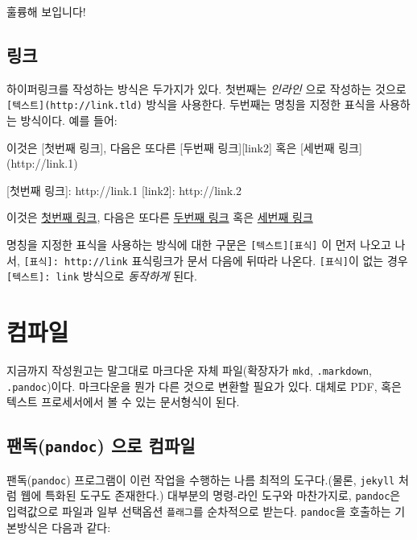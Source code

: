 \documentclass[
  letterpaper,
]{book}
\newenvironment{Shaded}{\begin{snugshade}}{\end{snugshade}}
\newcommand{\AttributeTok}[1]{\textcolor[rgb]{0.40,0.45,0.13}{#1}}
\newcommand{\KeywordTok}[1]{\textcolor[rgb]{0.00,0.23,0.31}{#1}}
\begin{document}
훌륭해 보입니다!

\hypertarget{uxb9c1uxd06c}{%
\subsection{링크}\label{uxb9c1uxd06c}}

하이퍼링크를 작성하는 방식은 두가지가 있다. 첫번째는 \emph{인라인} 으로
작성하는 것으로 \texttt{{[}텍스트{]}(http://link.tld)} 방식을 사용한다.
두번째는 명칭을 지정한 표식을 사용하는 방식이다. 예를 들어:

\begin{Shaded}
\begin{Highlighting}[]
\AttributeTok{이것은 [첫번째 링크], 다음은 또다른 [두번째 링크][link2] 혹은 [세번째 링크](http://link.1)}

\KeywordTok{[}\AttributeTok{첫번째 링크}\KeywordTok{]:}\AttributeTok{ http://link.1}
\KeywordTok{[}\AttributeTok{link2}\KeywordTok{]:}\AttributeTok{ http://link.2}
\end{Highlighting}
\end{Shaded}

이것은 \href{http://link.1}{첫번째 링크}, 다음은 또다른
\href{http://link.2}{두번째 링크} 혹은 \href{http://link.1}{세번째 링크}

명칭을 지정한 표식을 사용하는 방식에 대한 구문은
\texttt{{[}텍스트{]}{[}표식{]}} 이 먼저 나오고 나서,
\texttt{{[}표식{]}:\ http://link} 표식링크가 문서 다음에 뒤따라 나온다.
\texttt{{[}표식{]}}이 없는 경우 \texttt{{[}텍스트{]}:\ link} 방식으로
\emph{동작하게} 된다.

\hypertarget{uxcef4uxd30cuxc77c}{%
\section{컴파일}\label{uxcef4uxd30cuxc77c}}

지금까지 작성원고는 말그대로 마크다운 자체 파일(확장자가 \texttt{mkd},
\texttt{.markdown}, \texttt{.pandoc})이다. 마크다운을 뭔가 다른 것으로
변환할 필요가 있다. 대체로 PDF, 혹은 텍스트 프로세서에서 볼 수 있는
문서형식이 된다.

\hypertarget{uxd32cuxb3c5pandoc-uxc73cuxb85c-uxcef4uxd30cuxc77c}{%
\subsection{\texorpdfstring{팬독(\texttt{pandoc}) 으로
컴파일}{팬독(pandoc) 으로 컴파일}}\label{uxd32cuxb3c5pandoc-uxc73cuxb85c-uxcef4uxd30cuxc77c}}

팬독(\texttt{pandoc}) 프로그램이 이런 작업을 수행하는 나름 최적의
도구다.(물론, \texttt{jekyll} 처럼 웹에 특화된 도구도 존재한다.)
대부분의 명령-라인 도구와 마찬가지로, \texttt{pandoc}은 입력값으로
파일과 일부 선택옵션 \texttt{플래그}를 순차적으로 받는다.
\texttt{pandoc}을 호출하는 기본방식은 다음과 같다:
\end{document}
